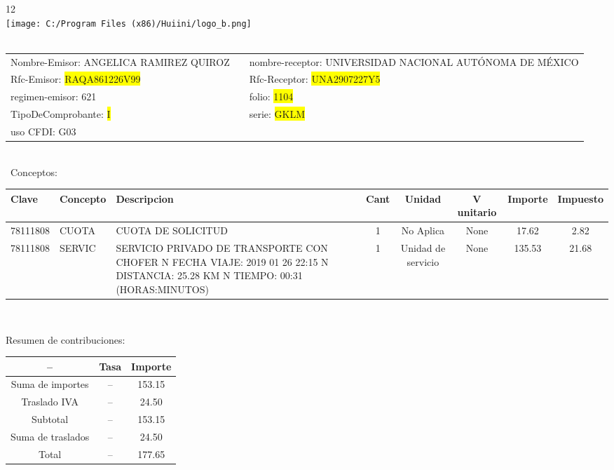 \documentclass{article}
\begin{document}
\hspace{18cm} 12\\
\texttt{[image: C:/Program Files (x86)/Huiini/logo\_b.png]}
\bigskip\\\
\begin{tabular}{p{11cm}p{1cm}p{8cm}}

Nombre-Emisor: ANGELICA RAMIREZ QUIROZ && nombre-receptor: UNIVERSIDAD NACIONAL AUTÓNOMA DE MÉXICO\\

Rfc-Emisor: \colorbox{yellow}{ RAQA861226V99 } & & Rfc-Receptor: \colorbox{yellow}{ UNA2907227Y5 }\\

regimen-emisor: 621 & & folio: \colorbox{yellow}{ 1104 }\\

TipoDeComprobante: \colorbox{yellow}{ I } & & serie: \colorbox{yellow}{ GKLM }\\

uso CFDI: G03\\



\end{tabular}
\bigskip\bigskip\bigskip\\\
Conceptos:\\
\begin{tabular}{|p{1.5cm}|p{3.6cm}|p{3.6cm}|c|c|c|c|c|}
\hline
Clave & Concepto & Descripcion & Cant & Unidad & V unitario & Importe & Impuesto \\
\hline

78111808 & CUOTA  & CUOTA DE SOLICITUD & 1 & No Aplica & None & 17.62 &  2.82 \\
\hline

78111808 & SERVIC & SERVICIO PRIVADO DE TRANSPORTE CON CHOFER  N FECHA VIAJE: 2019 01 26 22:15  N DISTANCIA: 25.28 KM  N TIEMPO: 00:31 (HORAS:MINUTOS) & 1 & Unidad de servicio & None & 135.53 &  21.68 \\
\hline

\end{tabular}\\
\bigskip
\begin{center}
Resumen de contribuciones:\\
\bigskip
\begin{tabular}{|c|c|c|}
\hline
 -- & Tasa & Importe\\
\hline

Suma de importes & -- & 153.15 \\
\hline

Traslado IVA & -- & 24.50 \\
\hline

Subtotal  & -- & 153.15 \\
\hline

Suma de traslados & -- & 24.50 \\
\hline

Total  & -- & 177.65 \\
\hline

\end{tabular}
\end{center}
\end{document}
